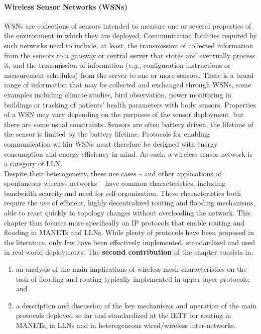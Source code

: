 \paragraph{Wireless Sensor Networks (WSNs)} WSNs are collections of sensors intended to measure one or several properties of the environment in which they are deployed. Communication facilities required by such networks need to include, at least, the transmission of collected information from the sensors to a gateway or central server that stores and eventually process it, and the transmission of information (\emph{e.g.}, configuration instructions or measurement schedules) from the server to one or more sensors. There is a broad range of information that may be collected and exchanged through WSNs, some examples including climate studies, bird observation, power monitoring in buildings or tracking of patients' health parameters with body sensors. Properties of a WSN may vary depending on the purposes of the sensor deployment, but there are some usual constraints. Sensors are often battery driven, the lifetime of the sensor is limited by the battery lifetime. Protocols for enabling communication within WSNs must therefore be designed with energy consumption and energy-efficiency in mind. As such, a wireless sensor network is a category of LLN.\\

Despite their heterogeneity, these use cases -- and other applications of spontaneous wireless networks -- have common characteristics, including bandwidth scarcity and need for self-organization. These characteristics both require the use of efficient, highly decentralized routing and flooding mechanisms, able to react quickly to topology changes without overloading the network. This chapter thus focuses more specifically  on IP protocols that enable routing and flooding in MANETs and LLNs. While plenty of protocols have been proposed in the literature, only few have been effectively implemented, standardized and used in real-world deployments. The {\bf second contribution} of the chapter consists in:

\begin{enumerate}[(1)] 
\item an analysis of the main implications of wireless mesh characteristics on the task of flooding and routing typically implemented in upper-layer protocols; and 
\item a description and discussion of the key mechanisms and operation of the main protocols deployed so far and standardized at the IETF for routing in MANETs, in LLNs and in heterogeneous wired/wireless inter-networks.
\end{enumerate}

